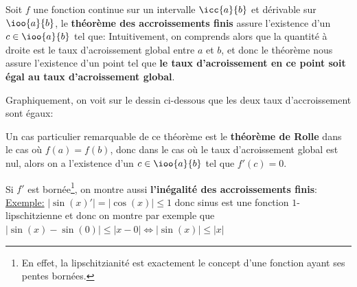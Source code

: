 Soit \(f\) une fonction continue sur un intervalle \(\icc{a}{b}\) et dérivable sur \(\ioo{a}{b}\), le \textbf{théorème des accroissements finis} assure l'existence d'un \(c \in \ioo{a}{b}\) tel que:
Intuitivement, on comprends alors que la quantité à droite est le taux d'acroissement global entre \(a\) et \(b\), et donc le théorème nous assure l'existence d'un point tel que \textbf{le taux d'acroissement en ce point soit égal au taux d'acroissement global}.
\pagebreak

Graphiquement, on voit sur le dessin ci-dessous que les deux taux d'accroissement sont égaux:
\begin{center}
\end{center}
Un cas particulier remarquable de ce théorème est le \textbf{théorème de Rolle} dans le cas où \(f(a) = f(b)\), donc dans le cas où le taux d'acroissement global est nul, alors on a l'existence d'un \(c \in \ioo{a}{b}\) tel que \(f'(c) = 0\).\<

Si \(f'\) est bornée\footnote[1]{En effet, la lipschitzianité est exactement le concept d'une fonction ayant ses pentes bornées.}, on montre aussi \textbf{l'inégalité des accroissements finis}:
\underline{Exemple:} \(|\sin(x)'| = |\cos(x)| \leq 1\) donc sinus est une fonction \(1\)-lipschitzienne et donc on montre par exemple que \(|\sin(x) - \sin(0)| \leq |x - 0| \Longleftrightarrow |\sin(x)| \leq |x|\)

